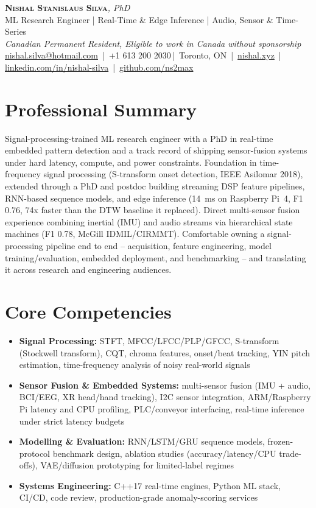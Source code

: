 \documentclass[11pt]{article}
\makeatletter
\newcommand{\cvName}{Nishal Stanislaus Silva}
\newcommand{\cvEmail}{nishal.silva@hotmail.com}
\newcommand{\cvPhone}{+1 613 200 2030}
\newcommand{\cvCity}{Toronto, ON}
\newcommand{\cvSite}{https://nishal.xyz}
\newcommand{\cvLinkedIn}{https://www.linkedin.com/in/nishal-silva}
\newcommand{\cvGitHub}{https://github.com/ns2max}
\newcommand{\cvStatus}{Canadian Permanent Resident, Eligible to work in Canada without sponsorship}
\newcommand{\cvTagline}{ML Research Engineer | Real-Time \& Edge Inference | Audio, Sensor \& Time-Series}
\makeatother
\begin{document}
\pagestyle{empty}
\begin{center}
    {\LARGE \scshape \textbf{\cvName}}{\large \textit{, PhD}}\\[1pt]
    {\small \cvTagline}\\[1pt]
    {\footnotesize\textit{\cvStatus}}\\[1pt]
    {\small
    \href{mailto:\cvEmail}{\cvEmail} \,|\, \cvPhone \,|\, \cvCity
    \,|\, \href{\cvSite}{nishal.xyz} \,|\, \href{\cvLinkedIn}{linkedin.com/in/nishal-silva}
    \,|\, \href{\cvGitHub}{github.com/ns2max}}
\end{center}

\section*{Professional Summary}
Signal-processing-trained ML research engineer with a PhD in real-time embedded pattern detection and a track record of shipping sensor-fusion systems under hard latency, compute, and power constraints. Foundation in time-frequency signal processing (S-transform onset detection, IEEE Asilomar 2018), extended through a PhD and postdoc building streaming DSP feature pipelines, RNN-based sequence models, and edge inference (14~ms on Raspberry Pi~4, F1 0.76, 74x faster than the DTW baseline it replaced). Direct multi-sensor fusion experience combining inertial (IMU) and audio streams via hierarchical state machines (F1 0.78, McGill IDMIL/CIRMMT). Comfortable owning a signal-processing pipeline end to end -- acquisition, feature engineering, model training/evaluation, embedded deployment, and benchmarking -- and translating it across research and engineering audiences.

\section*{Core Competencies}
\begin{itemize}[leftmargin=1.4em, itemsep=-0.2em, topsep=0.1em]
  \item \textbf{Signal Processing:} STFT, MFCC/LFCC/PLP/GFCC, S-transform (Stockwell transform), CQT, chroma features, onset/beat tracking, YIN pitch estimation, time-frequency analysis of noisy real-world signals
  \item \textbf{Sensor Fusion \& Embedded Systems:} multi-sensor fusion (IMU + audio, BCI/EEG, XR head/hand tracking), I2C sensor integration, ARM/Raspberry Pi latency and CPU profiling, PLC/conveyor interfacing, real-time inference under strict latency budgets
  \item \textbf{Modelling \& Evaluation:} RNN/LSTM/GRU sequence models, frozen-protocol benchmark design, ablation studies (accuracy/latency/CPU trade-offs), VAE/diffusion prototyping for limited-label regimes
  \item \textbf{Systems Engineering:} C++17 real-time engines, Python ML stack, CI/CD, code review, production-grade anomaly-scoring services
\end{itemize}
\end{document}
